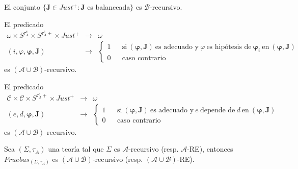   \begin{lemma} \label{lemma_109}
    \PN El conjunto $\{\mathbf{J} \in Just^{+}: \mathbf{J}$ es balanceada$\}$ es $\mathcal{B}$-recursivo.
  \end{lemma}

  \begin{lemma} \label{lemma_110}
    \PN El predicado
    \[
      \begin{array}{rcl}
        \omega \times S^{\tau_{A}^{e}} \times S^{\tau_{A}^{e}+} \times Just^{+} &\rightarrow& \omega \\
        (i, \varphi, \pmb{\varphi}, \mathbf{J}) &\rightarrow& \left\{
          \begin{array}{ccl}
            1 && \text{si} \ (\pmb{\varphi}, \mathbf{J}) \ \text{es adecuado y} \ \varphi \ \text{es hipótesis de} \
              \pmb{\varphi}_{i} \ \text{en} \ (\pmb{\varphi}, \mathbf{J}) \\
            0 && \text{caso contrario}
          \end{array}\right.
      \end{array}
    \]
    \PN es $(\mathcal{A} \cup \mathcal{B})$-recursivo.
  \end{lemma}

  \begin{lemma} \label{lemma_111}
    \PN El predicado
    \[
      \begin{array}{rcl}
        \mathcal{C} \times \mathcal{C} \times S^{\tau_{A}^{e}+} \times Just^{+} &\rightarrow& \omega \\
        (e, d, \pmb{\varphi}, \mathbf{J}) &\rightarrow& \left\{
          \begin{array}{ccl}
            1 && \text{si} \ (\pmb{\varphi}, \mathbf{J}) \ \text{es adecuado y} \ e \ \text{depende de} \ d \ \text{en}
              \ (\pmb{\varphi}, \mathbf{J}) \\
            0 && \text{caso contrario}
          \end{array}\right.
      \end{array}
    \]
    \PN es $(\mathcal{A} \cup \mathcal{B})$-recursivo.
  \end{lemma}

  \begin{lemma} \label{lemma_112}
    \PN Sea $(\Sigma, \tau_{A})$ una teoría tal que $\Sigma$ es $\mathcal{A}$-recursivo (resp. $\mathcal{A}$-RE),
    entonces $Pruebas_{(\Sigma, \tau_{A})}$ es $(\mathcal{A} \cup \mathcal{B})$-recursivo (resp. $(\mathcal{A} \cup
    \mathcal{B})$-RE).
  \end{lemma}

